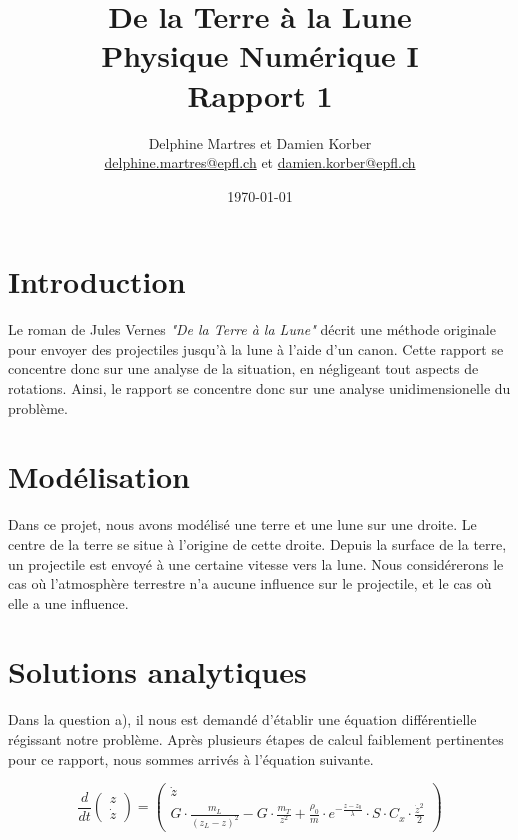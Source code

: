 \documentclass[a4paper,12pt,twoside]{article}
\newcommand{\mail}[1]{{\href{mailto:#1}{#1}}}
\begin{document}
\title{De la Terre à la Lune\\{\small Physique Numérique I}\\{\small Rapport 1}}
\date{\today}
\author{Delphine Martres et Damien Korber\\{\small \mail{delphine.martres@epfl.ch} et \mail{damien.korber@epfl.ch}}}
\maketitle
\tableofcontents %

\baselineskip=16pt
\parindent=15pt
\parskip=5pt




\section{Introduction}
Le roman de Jules Vernes \textit{"De la Terre à la Lune"} décrit une méthode originale pour envoyer des projectiles jusqu'à la lune à l'aide d'un canon. Cette rapport se concentre donc sur une analyse de la situation, en négligeant tout aspects de rotations. Ainsi, le rapport se concentre donc sur une analyse unidimensionelle du problème.

\section{Modélisation}
Dans ce projet, nous avons modélisé une terre et une lune sur une droite. Le centre de la terre se situe à l'origine de cette droite. Depuis la surface de la terre, un projectile est envoyé à une certaine vitesse vers la lune. Nous considérerons le cas où l'atmosphère terrestre n'a aucune influence sur le projectile, et le cas où elle a une influence.

\section{Solutions analytiques}
Dans la question a), il nous est demandé d'établir une équation différentielle régissant notre problème. Après plusieurs étapes de calcul faiblement pertinentes pour ce rapport, nous sommes arrivés à l'équation suivante.

\begin{equation}
    \frac{d}{dt}
    \begin{pmatrix}
        z \\
        \dot{z}
    \end{pmatrix}
    =
    \begin{pmatrix}
    \dot{z} \\
    G\cdot\frac{m_L}{(z_L - z)^2} - G\cdot\frac{m_T}{z^2} + \frac{\rho_0}{m}\cdot e^{-\frac{z-z_0}{\lambda}}\cdot S\cdot C_x\cdot \frac{\dot{z}^2}{2}
    \end{pmatrix}
    \label{eq:sol}
\end{equation}
\end{document}
